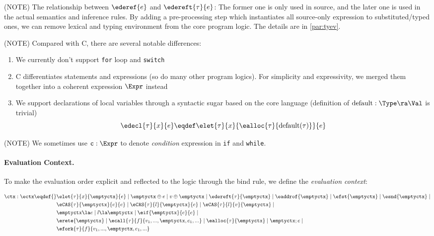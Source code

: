 (NOTE) The relationship between $\ederef{e}$ and $\edereft{\tau}{e}$: The former one is only used in source,
and the later one is used in the actual semantics and inference rules.
By adding a pre-processing step which instantiates all source-only expression to substituted/typed ones,
we can remove lexical and typing environment from the core program logic. The details are in \ref{par:tyev}.

(NOTE) Compared with C, there are several notable differences:
\begin{enumerate}
  \item We currently don't support \texttt{for} loop and \texttt{switch}
  \item C differentiates statements and expressions (so do many other program logics). For simplicity and
    expressivity, we merged them together into a coherent expression $\Expr$ instead
  \item We support declarations of local variables through a syntactic sugar based on the core language
        (definition of $\mathrm{default}: \Type \ra \Val$ is trivial)
        \[ \edecl{\tau}{x}{e} \eqdef \elet{\tau}{x}{\ealloc{\tau}{\mathrm{default}(\tau)}}{e}\]
\end{enumerate}

(NOTE) We sometimes use $\texttt{c} : \Expr$ to denote \emph{condition} expression
       in \texttt{if} and \texttt{while}.

\paragraph{Evaluation Context.}

To make the evaluation order explicit and reflected to the logic through the bind rule,
we define the \emph{evaluation context}:

\begin{align*}
    \ctx : \ectx \eqdef{}&
        \elet{\tau}{x}{\emptyctx}{e} \mid
        \emptyctx \oplus e \mid
        v \oplus \emptyctx \mid
        \edereft{\tau}{\emptyctx} \mid
        \eaddrof{\emptyctx} \mid
        \efst{\emptyctx} \mid
        \esnd{\emptyctx} \mid
        \\&
        \eCAS{\tau}{\emptyctx}{e}{e} \mid
        \eCAS{\tau}{l}{\emptyctx}{e} \mid
        \eCAS{\tau}{l}{v}{\emptyctx} \mid
        \\&
        \emptyctx \la e \mid
        l \la \emptyctx \mid
        \eif{\emptyctx}{e}{e} \mid
        \\&
        \erete{\emptyctx} \mid
        \ecall{\tau}{f}{v_1, ..., \emptyctx, e_1, ...} \mid
        \ealloc{\tau}{\emptyctx} \mid
        \emptyctx ; e \mid
        \\&
        \efork{\tau}{f}{v_1, ..., \emptyctx, e_1, ...}
\end{align*}

